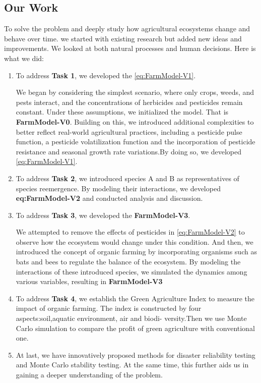 \documentclass[12pt]{article}  %
\begin{document}
\subsection{Our Work}
To solve the problem and deeply study how agricultural ecosystems change 
and behave over time.
we started with existing research but added new ideas and improvements. 
We looked at both natural processes and human decisions. Here is what we did:

\begin{enumerate}[\bfseries 1.]
    \item To address \textbf{Task 1}, we developed the \ref{eq:FarmModel-V1}.
    
    We began by considering the simplest scenario, where only 
    crops, weeds, and pests interact, and the concentrations of 
    herbicides and pesticides remain constant. Under these assumptions, 
    we initialized the model. That is \textbf{FarmModel-V0}.
    Building on this, we introduced additional complexities to better 
    reflect real-world agricultural practices, including a pesticide 
    pulse function, a pesticide volatilization function and the incorporation of 
    pesticide resistance and seasonal growth rate variations.By doing so, we 
    developed \ref{eq:FarmModel-V1}.
    

    \item To address \textbf{Task 2}, we introduced species A and B as 
    representatives of species reemergence. By modeling their interactions, 
    we developed \textbf{eq:FarmModel-V2} and conducted analysis and discussion.

    \item To address \textbf{Task 3}, we developed the \textbf{FarmModel-V3}. 
    
    We attempted to remove the effects of 
    pesticides in \ref{eq:FarmModel-V2} to 
    observe how the ecosystem would change under this condition. 
    And then, we introduced the concept of organic farming by 
    incorporating organisms such as bats and bees to regulate the balance of 
    the ecosystem. By modeling the interactions of these introduced species, 
    we simulated the dynamics among various variables, resulting in \textbf{FarmModel-V3}
    

    \item To address \textbf{Task 4}, we establish the Green Agriculture Index to measure the 
    impact of organic farming. The index is constructed by four aspects:soil,aquatic environment, air and biodi-
    versity.Then we
    use Monte Carlo simulation to compare the proﬁt of green agriculture with conventional
    one.

    \item At last, we have innovatively proposed methods for disaster reliability testing and Monte Carlo stability testing.
    At the same time, this further aids us in gaining a deeper understanding of the problem.

    
\end{enumerate}
\end{document}
